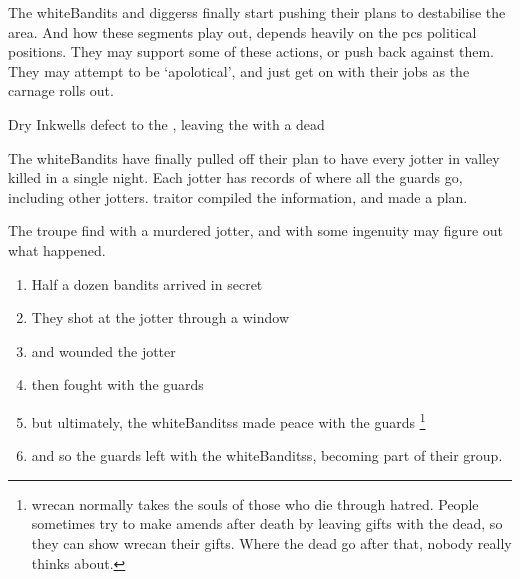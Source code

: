 \label{risingTitles}

\noindent
The \gls{whiteBandits} and \glspl{diggers} finally start pushing their plans to destabilise the area.
And how these \glspl{segment} play out, depends heavily on the \glspl{pc} political positions.
They may support some of these actions, or push back against them.
They may attempt to be `apolotical', and just get on with their jobs as the carnage rolls out.

{Dry Inkwells}%
{ defect to the , leaving the  with a dead }%

\begin{exampletext}
  The \gls{whiteBandits} have finally pulled off their plan to have every \gls{jotter} in \gls{valley} killed in a single night.
  Each \gls{jotter} has records of where all the \glspl{guard} go, including other \glspl{jotter}.
  \Gls{traitor} compiled the information, and made a plan.
\end{exampletext}

The troupe find  with a murdered \gls{jotter}, and with some ingenuity may figure out what happened.

\begin{enumerate}
  \item
  Half a dozen bandits arrived in secret
  \item
  They shot at the \gls{jotter} through a window
  \item
  and wounded the \gls{jotter}
  \item
  then fought with the \glspl{guard}
  \item
  but ultimately, the \glspl{whiteBandits} made peace with the \glspl{guard}
  \footnote{\Gls{wrecan} normally takes the souls of those who die through hatred.  People sometimes try to make amends after death by leaving gifts with the dead, so they can show \gls{wrecan} their gifts.  Where the dead go after that, nobody really thinks about.}
  \item
  and so the \glspl{guard} left with the \glspl{whiteBandits}, becoming part of their group.
\end{enumerate}

